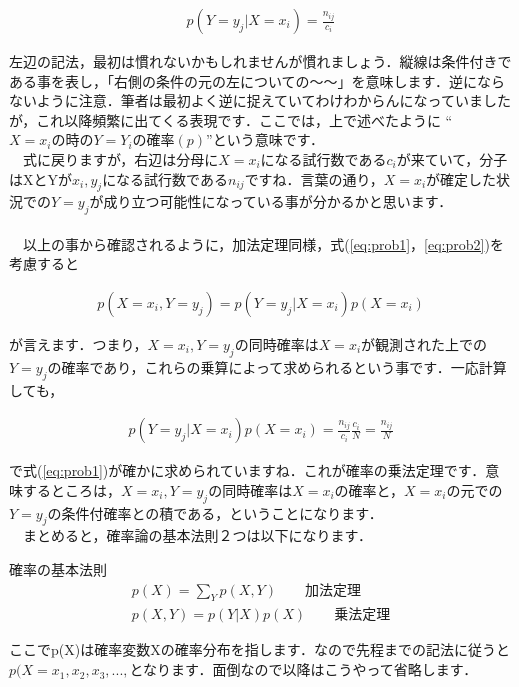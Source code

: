 \documentclass[11pt,a4paper,uplatex]{ujreport} 	%
\begin{document}
\begin{align}
\label{eq:conditional}
p(Y=y_j | X=x_i) = \frac{n_{ij}}{c_i}
\end{align}

左辺の記法，最初は慣れないかもしれませんが慣れましょう．縦線は条件付きである事を表し，「右側の条件の元の左についての～～」を意味します．逆にならないように注意．筆者は最初よく逆に捉えていてわけわからんになっていましたが，これ以降頻繁に出てくる表現です．ここでは，上で述べたように ``$X=x_iの時のY=Y_iの確率(p)$''という意味です．\\
　式に戻りますが，右辺は分母に$X=x_i$になる試行数である$c_i$が来ていて，分子はXとYが$x_i, y_j$になる試行数である$n_{ij}$ですね．言葉の通り，$X=x_i$が確定した状況での$Y=y_j$が成り立つ可能性になっている事が分かるかと思います．\\
\\
　以上の事から確認されるように，加法定理同様，式(\ref{eq:prob1}，\ref{eq:prob2})を考慮すると

\begin{align}
p(X=x_i , Y=y_j) = p(Y=y_j | X=x_i)p(X=x_i)
\label{eq:product}
\end{align}

が言えます．つまり，$X=x_i , Y=y_j$の同時確率は$X=x_i$が観測された上での$Y=y_j$の確率であり，これらの乗算によって求められるという事です．一応計算しても，

\begin{align}
p(Y=y_j | X=x_i)p(X=x_i) = \frac{n_{ij}}{c_i}\frac{c_i}{N} = \frac{n_{ij}}{N}
\label{eq:product}
\end{align}

で式(\ref{eq:prob1})が確かに求められていますね．これが確率の乗法定理です．意味するところは，$X=x_i, Y=y_j$の同時確率は$X=x_i$の確率と，$X=x_i$の元での$Y=y_j$の条件付確率との積である，ということになります．
\\
　まとめると，確率論の基本法則２つは以下になります．

\begin{screen}
確率の基本法則
\begin{align}
p(X) = \sum_Y p(X,Y) \qquad \text{加法定理} \nonumber \\
p(X,Y) = p(Y|X)p(X) \qquad \text{乗法定理} \nonumber
\end{align}
\end{screen}

ここでp(X)は確率変数Xの確率分布を指します．なので先程までの記法に従うと$p(X=x_1, x_2, x_3, ..., $となります．面倒なので以降はこうやって省略します．
\end{document}
